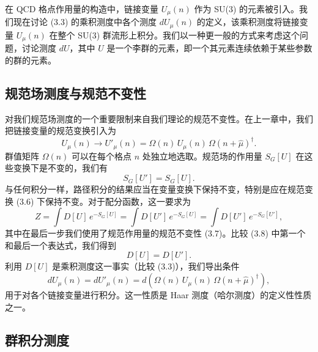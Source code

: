 在 QCD 格点作用量的构造中，链接变量 $U_\mu(n)$ 作为 SU(3) 的元素被引入。我们现在讨论 (3.3) 的乘积测度中各个测度 $dU_\mu(n)$ 的定义，该乘积测度将链接变量 $U_\mu(n)$ 在整个 SU(3) 群流形上积分。我们以一种更一般的方式来考虑这个问题，讨论测度 $dU$，其中 $U$ 是一个李群的元素，即一个其元素连续依赖于某些参数的群的元素。

\subsection{规范场测度与规范不变性}

对我们规范场测度的一个重要限制来自我们理论的规范不变性。在上一章中，我们把链接变量的规范变换引入为
\begin{equation}
  U_\mu(n) \to U'_\mu(n) = \Omega(n)\,U_\mu(n)\,\Omega(n+\hat\mu)^\dagger .
\end{equation}
群值矩阵 $\Omega(n)$ 可以在每个格点 $n$ 处独立地选取。规范场的作用量 $S_G[U]$ 在这些变换下是不变的，我们有
\begin{equation}
  S_G[U'] = S_G[U].
\end{equation}
与任何积分一样，路径积分的结果应当在变量变换下保持不变，特别是应在规范变换 (3.6) 下保持不变。对于配分函数，这一要求为
\begin{equation}
  Z = \int D[U]\,e^{-S_G[U]}
    = \int D[U']\,e^{-S_G[U]}
    = \int D[U']\,e^{-S_G[U']},
\end{equation}
其中在最后一步我们使用了规范作用量的规范不变性 (3.7)。比较 (3.8) 中第一个和最后一个表达式，我们得到
\begin{equation}
  D[U] = D[U'].
\end{equation}
利用 $D[U]$ 是乘积测度这一事实（比较 (3.3)），我们导出条件
\begin{equation}
  dU_\mu(n) = dU'_\mu(n) = d\!\left(\Omega(n)\,U_\mu(n)\,\Omega(n+\hat\mu)^\dagger\right),
\end{equation}
用于对各个链接变量进行积分。这一性质是 Haar 测度（哈尔测度）的定义性性质之一。

\subsection{群积分测度}

